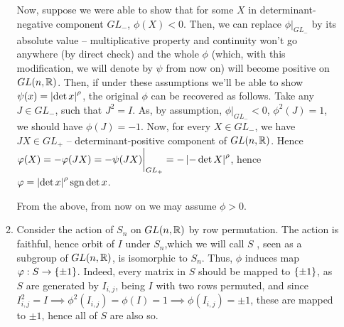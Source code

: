 \documentclass[10pt]{article} %
\newcommand{\sgn}{\mbox{\normalfont{sgn}}}
\begin{document}
\begin{enumerate}[1. ]
\begin{enumerate}[1$^\circ$]
Now, suppose we were able to show that for some $X$ in determinant-negative component $GL_-$, $\phi(X)<0$. Then, we can replace $\phi\bigg|_{GL_-}$
by its absolute value -- multiplicative property and continuity won't go anywhere (by direct check) and the whole $\phi$ (which,
with this modification, we will denote by $\psi$ from now on) will become positive on $GL(n,\mathbb{R})$.
Then, if under these assumptions we'll be able to show $\psi(x)=\left|\det x\right|^\rho$, the original $\phi$ can be recovered as follows.
Take any $J\in GL_-$, such that $J^2=I$. As, by assumption, $\phi\bigg|_{GL_-}<0$, $\phi^2(J)=1$, we should have $\phi(J)=-1$. Now, for every
$X\in GL_-$, we have $JX\in GL_+$ -- determinant-positive component of $GL(n,\mathbb{R})$. Hence $\varphi(X)=-\varphi(JX)=-\psi(JX)\bigg|_{GL_+}=-\left|-\det X\right|^
\rho$, hence $\phi=\myabs{\det x}^\rho\sgn\det x$.

From the above, from now on we may assume $\phi>0$.
\item Consider the action of $S_n$ on $GL(n,\mathbb{R})$ by row permutation. The action is faithful, hence orbit of $I$ under $S_n$,which we will call $S$
, seen as a subgroup
of $GL(n,\mathbb{R})$, is isomorphic to $S_n$. Thus, $\phi$ induces map $\varphi:S\to\left\{\pm1\right\}$. Indeed, every matrix in $S$ should be mapped to $\left\{
\pm1\right\}$, as $S$ are generated by $I_{i,j}$, being $I$ with two rows permuted, and since $I^2_{i,j}=I\implies\phi^2(I_{i,j})=\phi(I)=1\implies
\phi(I_{i,j})=\pm1$, these are mapped to $\pm1$, hence all of $S$ are also so.


\end{enumerate}
\end{enumerate}
\end{document}
